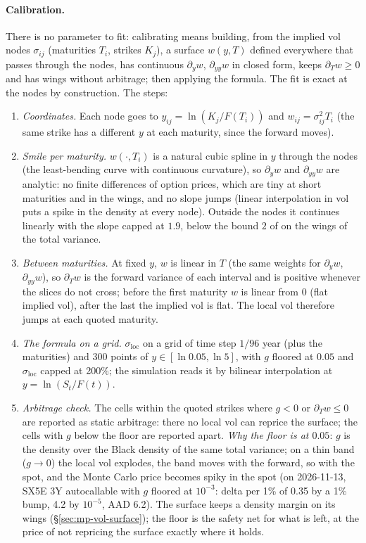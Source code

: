 \paragraph{Calibration.} There is no parameter to fit: calibrating means building, from the implied vol nodes $\sigma_{ij}$
(maturities $T_i$, strikes $K_j$), a surface $w(y, T)$ defined everywhere that passes through the nodes, has continuous
$\partial_y w$, $\partial_{yy} w$ in closed form, keeps $\partial_T w \ge 0$ and has wings without arbitrage; then applying the formula. The fit is
exact at the nodes by construction. The steps:
\begin{enumerate}[nosep]
  \item \emph{Coordinates.} Each node goes to $y_{ij} = \ln(K_j / F(T_i))$ and $w_{ij} = \sigma_{ij}^2 T_i$ (the same strike has a different $y$ at
        each maturity, since the forward moves).
  \item \emph{Smile per maturity.} $w(\cdot, T_i)$ is a natural cubic spline in $y$ through the nodes (the least-bending curve with
        continuous curvature), so $\partial_y w$ and $\partial_{yy} w$ are analytic: no finite differences of option prices, which are tiny
        at short maturities and in the wings, and no slope jumps (linear interpolation in vol puts a spike in the
        density at every node). Outside the nodes it continues linearly with the slope capped at $1.9$, below the
        bound $2$ of \citet{lee2004} on the wings of the total variance.
  \item \emph{Between maturities.} At fixed $y$, $w$ is linear in $T$ (the same weights for $\partial_y w$, $\partial_{yy} w$), so $\partial_T w$ is the
        forward variance of each interval and is positive whenever the slices do not cross; before the first maturity
        $w$ is linear from $0$ (flat implied vol), after the last the implied vol is flat. The local vol therefore jumps
        at each quoted maturity.
  \item \emph{The formula on a grid.} $\sigma_{\mathrm{loc}}$ on a grid of time step $1/96$ year (plus the maturities) and 300 points of
        $y \in [\ln 0.05, \ln 5]$, with $g$ floored at $0.05$ and $\sigma_{\mathrm{loc}}$ capped at 200\%; the simulation reads it by bilinear
        interpolation at $y = \ln(S_t/F(t))$.
  \item \emph{Arbitrage check.} The cells within the quoted strikes where $g < 0$ or $\partial_T w \le 0$ are reported as static
        arbitrage: there no local vol can reprice the surface; the cells with $g$ below the floor are reported apart.
        \emph{Why the floor is at $0.05$}: $g$ is the density over the Black density of the same total variance; on a
        thin band ($g \to 0$) the local vol explodes, the band moves with the forward, so with the spot, and the Monte Carlo
        price becomes spiky in the spot (on 2026-11-13, SX5E 3Y autocallable with $g$ floored at $10^{-3}$: delta per 1\% of
        0.35 by a 1\% bump, 4.2 by $10^{-5}$, AAD 6.2). The surface keeps a density margin on its wings
        (\S\ref{sec:mp-vol-surface}); the floor is the safety net for what is left, at the price of not repricing the
        surface exactly where it holds.
\end{enumerate}

